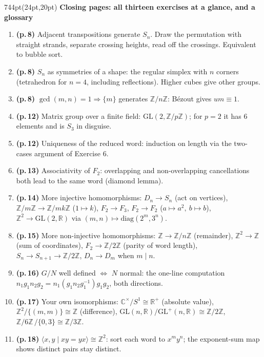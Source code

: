 \documentclass[10pt]{article}
\newcommand{\Z}{\mathbb{Z}}
\newcommand{\R}{\mathbb{R}}
\newcommand{\C}{\mathbb{C}}
\newcommand{\GL}{\mathrm{GL}}
\newcommand{\inv}{^{-1}}
\begin{document}
\begin{textblock*}{744pt}(24pt,20pt)
{\sffamily\bfseries\large\color{big} Closing pages: all thirteen exercises at a glance, and a glossary}\par\vspace{6pt}
\begin{minipage}[t]{370pt}
\small
\begin{enumerate}[leftmargin=*,itemsep=2pt]
\item \textbf{(p.\,8)} Adjacent transpositions generate $S_n$. Draw the permutation with straight strands, separate crossing heights, read off the crossings. Equivalent to bubble sort.
\item \textbf{(p.\,8)} $S_n$ as symmetries of a shape: the regular simplex with $n$ corners (tetrahedron for $n=4$, including reflections). Higher cubes give other groups.
\item \textbf{(p.\,8)} $\gcd(m,n)=1\Rightarrow\{m\}$ generates $\Z/n\Z$: B\'ezout gives $um\equiv1$.
\item \textbf{(p.\,12)} Matrix group over a finite field: $\GL(2,\Z/p\Z)$; for $p=2$ it has 6 elements and is $S_3$ in disguise.
\item \textbf{(p.\,12)} Uniqueness of the reduced word: induction on length via the two-cases argument of Exercise 6.
\item \textbf{(p.\,13)} Associativity of $F_2$: overlapping and non-overlapping cancellations both lead to the same word (diamond lemma).
\item \textbf{(p.\,14)} More injective homomorphisms: $D_n\to S_n$ (act on vertices), $\Z/m\Z\to\Z/mk\Z$ ($1\mapsto k$), $F_2\to F_3$, $F_2\to F_2$ ($a\mapsto a^2,\ b\mapsto b$), $\Z^2\to\GL(2,\R)$ via $(m,n)\mapsto\mathrm{diag}(2^m,3^n)$.
\item \textbf{(p.\,15)} More non-injective homomorphisms: $\Z\to\Z/n\Z$ (remainder), $\Z^2\to\Z$ (sum of coordinates), $F_2\to\Z/2\Z$ (parity of word length), $S_n\to S_{n+1}\to\Z/2\Z$, $D_n\to D_m$ when $m\mid n$.
\item \textbf{(p.\,16)} $G/N$ well defined $\iff$ $N$ normal: the one-line computation $n_1g_1n_2g_2=n_1(g_1n_2g_1\inv)g_1g_2$, both directions.
\item \textbf{(p.\,17)} Your own isomorphisms: $\C^\times/S^1\cong\R^{+}$ (absolute value), $\Z^2/\{(m,m)\}\cong\Z$ (difference), $\GL(n,\R)/\GL^+(n,\R)\cong\Z/2\Z$, $\Z/6\Z\,/\{0,3\}\cong\Z/3\Z$.
\item \textbf{(p.\,18)} $\langle x,y\mid xy=yx\rangle\cong\Z^2$: sort each word to $x^my^n$; the exponent-sum map shows distinct pairs stay distinct.

\end{enumerate}
\end{minipage}
\end{textblock*}
\end{document}
